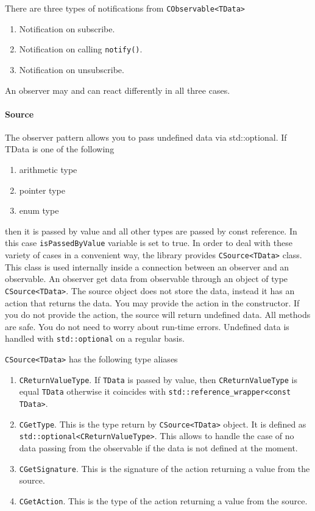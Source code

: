 \documentclass{article}
\begin{document}
There are three types of notifications from \verb"CObservable<TData>"
\begin{enumerate}
\item Notification on subscribe.
\item Notification on calling \verb"notify()".
\item Notification on unsubscribe.
\end{enumerate}
An observer may and can react differently in all three cases.

\paragraph{Source}

The observer pattern allows you to pass undefined data via std::optional. If TData is one of the following
\begin{enumerate}
\item arithmetic type
\item pointer type
\item enum type
\end{enumerate}
then it is passed by value and all other types are passed by const reference. In this case \verb"isPassedByValue" variable is set to true. In order to deal with these variety of cases in a convenient way, the library provides \verb"CSource<TData>" class. This class is used internally inside a connection between an observer and an observable. An observer get data from observable through an object of type \verb"CSource<TData>". The source object does not store the data, instead it has an action that returns the data. You may provide the action in the constructor. If you do not provide the action, the source will return undefined data. All methods are safe. You do not need to worry about run-time errors. Undefined data is handled with \verb"std::optional" on a regular basis.

\verb"CSource<TData>" has the following type aliases
\begin{enumerate}
\item \verb"CReturnValueType". If \verb"TData" is passed by value, then \verb"CReturnValueType" is equal \verb"TData" otherwise it coincides with \verb"std::reference_wrapper<const TData>".

\item \verb"CGetType". This is the type return by \verb"CSource<TData>" object. It is defined as \verb"std::optional<CReturnValueType>". This allows to handle the case of no data passing from the observable if the data is not defined at the moment.

\item \verb"CGetSignature". This is the signature of the action returning a value from the source.

\item \verb"CGetAction". This is the type of the action returning a value from the source.
\end{enumerate}
\end{document}

